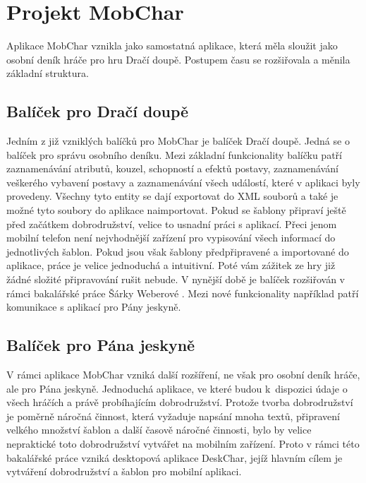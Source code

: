 \documentclass[thesis=B,czech]{resources/FITthesis}[2012/06/26]
\begin{document}
\section{Projekt MobChar}	
Aplikace MobChar vznikla jako samostatná aplikace, která měla sloužit jako osobní deník hráče pro hru Dračí doupě. Postupem času se rozšiřovala a měnila základní struktura. 

\subsection{Balíček pro Dračí doupě}
Jedním z již vzniklých balíčků pro MobChar je balíček Dračí doupě. Jedná se o balíček pro správu  osobního deníku. Mezi základní funkcionality balíčku patří zaznamenávání atributů, kouzel, schopností a efektů postavy, zaznamenávání veškerého vybavení postavy a zaznamenávání všech událostí, které v aplikaci byly provedeny. Všechny tyto entity se dají exportovat do XML souborů a také je možné tyto soubory do aplikace naimportovat. Pokud se šablony připraví ještě před začátkem dobrodružství, velice to usnadní práci s aplikací. Přeci jenom mobilní telefon není nejvhodnější zařízení pro vypisování všech informací do jednotlivých šablon. Pokud jsou však šablony předpřipravené a importované do aplikace, práce je velice jednoduchá a intuitivní. Poté vám zážitek ze hry již žádné složité připravování rušit nebude. V nynější době je balíček rozšiřován v rámci bakalářské práce Šárky Weberové \cite{Weberova_2017}. Mezi nové funkcionality například patří komunikace s aplikací pro Pány jeskyně.

\subsection{Balíček pro Pána jeskyně}
V rámci aplikace MobChar vzniká další rozšíření, ne však pro osobní deník hráče, ale pro Pána jeskyně. Jednoduchá aplikace, ve které budou k~dispozici údaje o všech hráčích a právě probíhajícím dobrodružství. Protože tvorba dobrodružství je poměrně náročná činnost, která vyžaduje napsání mnoha textů, připravení velkého množství šablon a další časově náročné činnosti, bylo by velice nepraktické toto dobrodružství vytvářet na mobilním zařízení. Proto v rámci této bakalářské práce vzniká desktopová aplikace DeskChar, jejíž hlavním cílem je vytváření dobrodružství a šablon pro mobilní aplikaci.
\end{document}
